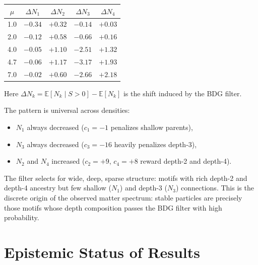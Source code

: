 \documentclass[11pt]{article}
\begin{document}
\begin{center}
\begin{tabular}{ccccc}
\toprule
$\mu$ & $\Delta N_1$ & $\Delta N_2$ & $\Delta N_3$ & $\Delta N_4$ \\
\midrule
1.0 & $-0.34$ & $+0.32$ & $-0.14$ & $+0.03$ \\
2.0 & $-0.12$ & $+0.58$ & $-0.66$ & $+0.16$ \\
4.0 & $-0.05$ & $+1.10$ & $-2.51$ & $+1.32$ \\
4.7 & $-0.06$ & $+1.17$ & $-3.17$ & $+1.93$ \\
7.0 & $-0.02$ & $+0.60$ & $-2.66$ & $+2.18$ \\
\bottomrule
\end{tabular}
\end{center}

Here $\Delta N_k=\mathbb{E}[N_k\mid S>0]-\mathbb{E}[N_k]$ is the shift induced by the BDG filter.

The pattern is universal across densities:
\begin{itemize}[nosep]
    \item $N_1$ always decreased ($c_1=-1$ penalizes shallow parents),
    \item $N_3$ always decreased ($c_3=-16$ heavily penalizes depth-3),
    \item $N_2$ and $N_4$ increased ($c_2=+9$, $c_4=+8$ reward depth-2 and depth-4).
\end{itemize}
The filter selects for wide, deep, sparse structure: motifs with rich depth-2 and depth-4 ancestry but few shallow ($N_1$) and depth-3 ($N_3$) connections. This is the discrete origin of the observed matter spectrum: stable particles are precisely those motifs whose depth composition passes the BDG filter with high probability.

\section{Epistemic Status of Results}
\label{sec:status}
\end{document}
